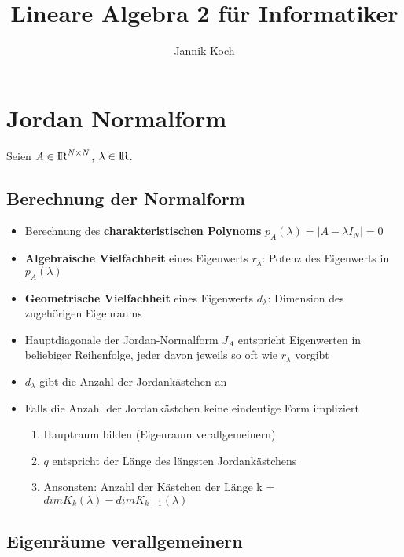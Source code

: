\documentclass[10pt,a4paper]{article}
\author{Jannik Koch}
\title{Lineare Algebra 2 für Informatiker}
\def\realnumbers{{\rm I\!R}}
\begin{document}
	{\let\newpage\relax\maketitle}
	\tableofcontents
	\newpage
	\setcounter{page}{1}

	\section{Jordan Normalform}
	\label{jd:sec:jordan_normalform}

	Seien $A \in \realnumbers^{N\times N}$, $\lambda \in \realnumbers$.
	
	\subsection{Berechnung der Normalform}
	\label{jd:sub:berechnung_der_normalform}
	
	\begin{itemize}
		\item Berechnung des \textbf{charakteristischen Polynoms} $p_A(\lambda) = |A - \lambda I_N| = 0$
		\item \textbf{Algebraische Vielfachheit} eines Eigenwerts $r_\lambda$: Potenz des Eigenwerts in $p_A(\lambda)$
		\item \textbf{Geometrische Vielfachheit} eines Eigenwerts $d_\lambda$: Dimension des zugehörigen Eigenraums
		\item Hauptdiagonale der Jordan-Normalform $J_A$ entspricht Eigenwerten in beliebiger Reihenfolge, jeder davon jeweils so oft wie $r_\lambda$ vorgibt
		\item $d_\lambda$ gibt die Anzahl der Jordankästchen an
		\item Falls die Anzahl der Jordankästchen keine eindeutige Form impliziert
			\begin{enumerate}
				\item Hauptraum bilden (Eigenraum verallgemeinern)
				\item $q$ entspricht der Länge des längsten Jordankästchens
				\item Ansonsten: Anzahl der Kästchen der Länge k = $dim K_k(\lambda) - dim K_{k - 1}(\lambda)$
			\end{enumerate}
	\end{itemize}
	
	\subsection{Eigenräume verallgemeinern}
	\label{jd:sub:eigenraeume_verallgemeinern}
	
\end{document}
